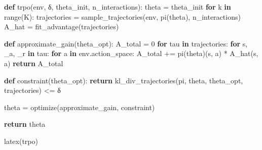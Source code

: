 \documentclass[
  letterpaper,
  DIV=11,
  numbers=noendperiod]{scrreprt}
\newenvironment{Shaded}{\begin{snugshade}}{\end{snugshade}}
\newcommand{\BuiltInTok}[1]{\textcolor[rgb]{0.00,0.23,0.31}{#1}}
\newcommand{\ControlFlowTok}[1]{\textcolor[rgb]{0.00,0.23,0.31}{\textbf{#1}}}
\newcommand{\DecValTok}[1]{\textcolor[rgb]{0.68,0.00,0.00}{#1}}
\newcommand{\KeywordTok}[1]{\textcolor[rgb]{0.00,0.23,0.31}{\textbf{#1}}}
\newcommand{\NormalTok}[1]{\textcolor[rgb]{0.00,0.23,0.31}{#1}}
\newcommand{\OperatorTok}[1]{\textcolor[rgb]{0.37,0.37,0.37}{#1}}
\theoremstyle{plain}
\theoremstyle{plain}
\theoremstyle{definition}
\theoremstyle{definition}
\theoremstyle{remark}
\begin{document}
\begin{Shaded}
\begin{Highlighting}[]
\KeywordTok{def}\NormalTok{ trpo(env, δ, theta\_init, n\_interactions):}
\NormalTok{    theta }\OperatorTok{=}\NormalTok{ theta\_init}
    \ControlFlowTok{for}\NormalTok{ k }\KeywordTok{in} \BuiltInTok{range}\NormalTok{(K):}
\NormalTok{        trajectories }\OperatorTok{=}\NormalTok{ sample\_trajectories(env, pi(theta), n\_interactions)}
\NormalTok{        A\_hat }\OperatorTok{=}\NormalTok{ fit\_advantage(trajectories)}
        
        \KeywordTok{def}\NormalTok{ approximate\_gain(theta\_opt):}
\NormalTok{            A\_total }\OperatorTok{=} \DecValTok{0}
            \ControlFlowTok{for}\NormalTok{ tau }\KeywordTok{in}\NormalTok{ trajectories:}
                \ControlFlowTok{for}\NormalTok{ s, \_a, \_r }\KeywordTok{in}\NormalTok{ tau:}
                    \ControlFlowTok{for}\NormalTok{ a }\KeywordTok{in}\NormalTok{ env.action\_space:}
\NormalTok{                        A\_total }\OperatorTok{+=}\NormalTok{ pi(theta)(s, a) }\OperatorTok{*}\NormalTok{ A\_hat(s, a)}
            \ControlFlowTok{return}\NormalTok{ A\_total}
        
        \KeywordTok{def}\NormalTok{ constraint(theta\_opt):}
            \ControlFlowTok{return}\NormalTok{ kl\_div\_trajectories(pi, theta, theta\_opt, trajectories) }\OperatorTok{\textless{}=}\NormalTok{ δ}
        
\NormalTok{        theta }\OperatorTok{=}\NormalTok{ optimize(approximate\_gain, constraint)}

    \ControlFlowTok{return}\NormalTok{ theta}

\NormalTok{latex(trpo)}
\end{Highlighting}
\end{Shaded}
\end{document}
